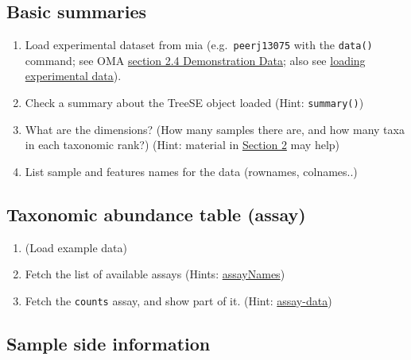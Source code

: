 \documentclass[
]{book}
\providecommand{\tightlist}{%
  \setlength{\itemsep}{0pt}\setlength{\parskip}{0pt}}
\begin{document}
\hypertarget{basic-summaries}{%
\subsection{Basic summaries}\label{basic-summaries}}

\begin{enumerate}
\def\labelenumi{\arabic{enumi}.}
\tightlist
\item
  Load experimental dataset from mia (e.g.~\texttt{peerj13075} with the \texttt{data()} command; see OMA \href{https://microbiome.github.io/OMA/containers.html\#example-data}{section 2.4 Demonstration Data}; also see \href{https://microbiome.github.io/OMA/containers.html\#assay-data}{loading experimental data}).
\item
  Check a summary about the TreeSE object loaded (Hint: \texttt{summary()})
\item
  What are the dimensions? (How many samples there are, and how many taxa in each taxonomic rank?) (Hint: material in \href{https://microbiome.github.io/OMA/containers.html\#data-science-framework}{Section 2} may help)
\item
  List sample and features names for the data (rownames, colnames..)
\end{enumerate}

\hypertarget{taxonomic-abundance-table-assay}{%
\subsection{Taxonomic abundance table (assay)}\label{taxonomic-abundance-table-assay}}

\begin{enumerate}
\def\labelenumi{\arabic{enumi}.}
\tightlist
\item
  (Load example data)
\item
  Fetch the list of available assays (Hints: \href{https://microbiome.github.io/OMA/containers.html\#assay-data}{assayNames})
\item
  Fetch the \texttt{counts} assay, and show part of it. (Hint: \href{https://microbiome.github.io/OMA/containers.html\#assay-data}{assay-data})
\end{enumerate}

\hypertarget{sample-side-information}{%
\subsection{Sample side information}\label{sample-side-information}}
\end{document}
